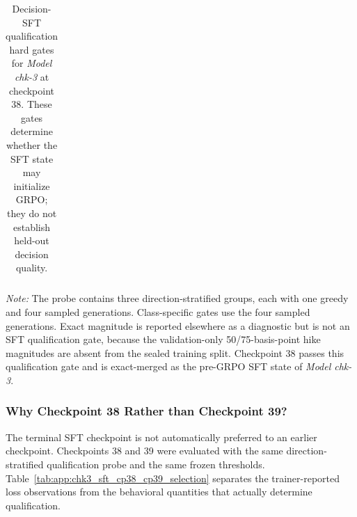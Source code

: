 \begin{table}[htbp]
\begin{tabularx}{\textwidth}{@{}>{\raggedright\arraybackslash}Xccc>{\raggedright\arraybackslash}X@{}}
        \bottomrule
    \end{tabularx}
    \begin{minipage}{0.97\textwidth}
        \vspace{2pt}
        \footnotesize
        \textit{Note:} The probe contains three direction-stratified groups,
        each with one greedy and four sampled generations. Class-specific gates
        use the four sampled generations. Exact magnitude is reported elsewhere
        as a diagnostic but is not an SFT qualification gate, because the
        validation-only 50/75-basis-point hike magnitudes are absent from the
        sealed training split. Checkpoint 38 passes this qualification gate and
        is exact-merged as the pre-GRPO SFT state of \textit{Model chk-3}.
    \end{minipage}
    \caption{Decision-SFT qualification hard gates for \textit{Model chk-3}
    at checkpoint 38. These gates determine whether the SFT state may initialize
    GRPO; they do not establish held-out decision quality.}
    \label{tab:app:chk3_sft_qualification_gates}
\end{table}

\subsubsection*{Why Checkpoint 38 Rather than Checkpoint 39?}

The terminal SFT checkpoint is not automatically preferred to an earlier
checkpoint. Checkpoints 38 and 39 were evaluated with the same
direction-stratified qualification probe and the same frozen thresholds.
Table~\ref{tab:app:chk3_sft_cp38_cp39_selection} separates the trainer-reported
loss observations from the behavioral quantities that actually determine
qualification.

